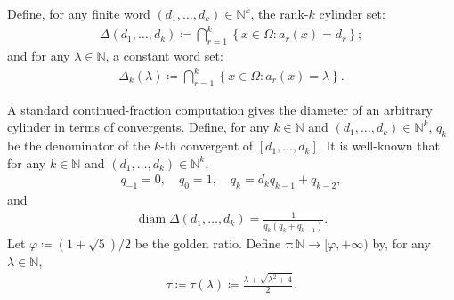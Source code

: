 \documentclass[12pt,reqno]{amsart}
\theoremstyle{definition}
\theoremstyle{plain}
\begin{document}
Define, for any finite word $(d_1,\dots,d_k)\in\mathbb{N}^k$, the rank-$k$ cylinder set:
\begin{align*}
    \Delta{(d_1,\dots,d_k)}
    \coloneqq \bigcap_{r=1}^k \left\{x\in\Omega: a_r(x)=d_r\right\};
\end{align*}
and for any $\lambda\in\mathbb{N}$, a constant word set:
\begin{align*}
    \Delta_k{\left({\lambda}\right)}
    \coloneqq \bigcap_{r=1}^k \left\{x\in\Omega: a_r(x)=\lambda\right\}.
\end{align*}

A standard continued-fraction computation gives the diameter of an arbitrary cylinder in terms of convergents. Define, for any $k\in\mathbb{N}$ and $(d_1,\dots,d_k)\in\mathbb{N}^k$, $q_k$ be the denominator of the $k$-th convergent of $[d_1,\dots,d_k]$. It is well-known that for any $k\in\mathbb{N}$ and $(d_1,\dots,d_k)\in\mathbb{N}^k$,
\begin{align*}
    q_{-1}=0,\quad q_0=1,\quad q_k=d_k q_{k-1}+q_{k-2},
\end{align*}
and
\begin{align}\label{eq: 17}
    \operatorname{diam}{\Delta{(d_1,\dots,d_k)}}
    =\frac{1}{q_k(q_k+q_{k-1})}.
\end{align}
Let $\varphi\coloneqq(1+\sqrt5)/2$ be the golden ratio. Define $\tau:\mathbb{N}\to[\varphi,+\infty)$ by, for any  $\lambda\in\mathbb {N}$,
\begin{align*}
    \tau\coloneqq\tau(\lambda)\coloneqq \frac{\lambda+\sqrt{\lambda^2+4}}{2}.
\end{align*}
\end{document}

